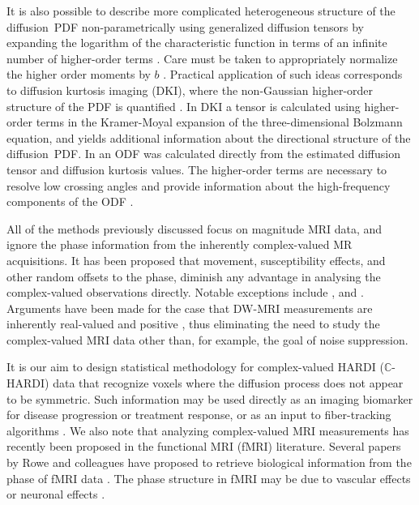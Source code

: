 \documentclass[authoryear,preprint,12pt]{elsarticle}
\newcommand{\bbC}{\mathbb{C}}
\begin{document}
It is also possible to describe more complicated heterogeneous
structure of the diffusion~PDF non-parametrically using generalized
diffusion tensors by expanding the logarithm of the characteristic
function in terms of an infinite number of higher-order terms
\citep{Ozarslan03,Liu2005,Liu2004}.  Care must be taken to
appropriately normalize the higher order moments by $b$
\cite{Liu2005}.  Practical application of such ideas corresponds to
diffusion kurtosis imaging (DKI), where the non-Gaussian higher-order
structure of the PDF is quantified \citep{Jensen2005,Lu2006,Hui2008}.
In DKI a tensor is calculated using higher-order terms in the
Kramer-Moyal expansion of the three-dimensional Bolzmann equation, and
yields additional information about the directional structure of the
diffusion~PDF.  In \citet{Lazar} an ODF was calculated directly from
the estimated diffusion tensor and diffusion kurtosis values.
The higher-order terms are necessary to resolve low crossing angles
and provide information about the high-frequency components of the ODF
\citep{laz:mapping}.

All of the methods previously discussed
focus on magnitude MRI data, and ignore the phase information from the
inherently complex-valued MR acquisitions.  It has been proposed that
movement, susceptibility effects, and other random offsets to the
phase, diminish any advantage in analysing the complex-valued
observations directly.  Notable exceptions include \citet{Liu2005},
\citet{Aksoyetal2008} and \citet{Newbould}.  Arguments have been made
for the case that DW-MRI measurements are inherently real-valued and
positive \citep{Wedeen05}, thus eliminating the need to study the
complex-valued MRI data other than, for example, the goal of noise
suppression.

It is our aim to design statistical methodology for complex-valued
HARDI ($\bbC$-HARDI) data that recognize voxels where the diffusion
process does not appear to be symmetric.  Such information may be used
directly as an imaging biomarker for disease progression or treatment
response, or as an input to fiber-tracking algorithms
\citep{laz:mapping,chu-cho-che:principles}.  We also note that
analyzing complex-valued MRI measurements has recently been proposed
in the functional MRI (fMRI) literature.  Several papers by Rowe and
colleagues have proposed to retrieve biological information from the
phase of fMRI data \citep{Rowe2004,Rowe2005,Rowe2007}.  The phase
structure in fMRI may be due to vascular effects \citep{Menon} or
neuronal effects \citep{Bodurka}.
\end{document}
